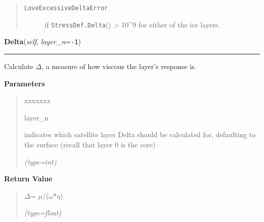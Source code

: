 \begin{boxedminipage}{\funcwidth}
      \begin{quote}
        \begin{description}

          \item[\texttt{LoveExcessiveDeltaError}]

          if \texttt{StressDef.Delta}() {\textgreater} 
          10{\textasciicircum}9 for either of the ice layers.

        \end{description}

      \end{quote}

    \end{boxedminipage}

    \label{SatStress:SatStress:StressDef:Delta}

    \vspace{0.5ex}

\hspace{.8\funcindent}\begin{boxedminipage}{\funcwidth}

    \raggedright \textbf{Delta}(\textit{self}, \textit{layer\_n}={\tt -1})

    \vspace{-1.5ex}

    \rule{\textwidth}{0.5\fboxrule}
\setlength{\parskip}{2ex}
    Calculate \(\Delta\), a measure of how viscous the layer's response is.

\setlength{\parskip}{1ex}
      \textbf{Parameters}
      \vspace{-1ex}

      \begin{quote}
        \begin{Ventry}{xxxxxxx}

          \item[layer\_n]

          indicates which satellite layer Delta should be calculated for, 
          defaulting to the surface (recall that layer 0 is the core)

            {\it (type=int)}

        \end{Ventry}

      \end{quote}

      \textbf{Return Value}
    \vspace{-1ex}

      \begin{quote}
      \(\Delta\)= \(\mu\)/(\(\omega\)*\(\eta\))

      {\it (type=float)}

      \end{quote}

    \end{boxedminipage}

